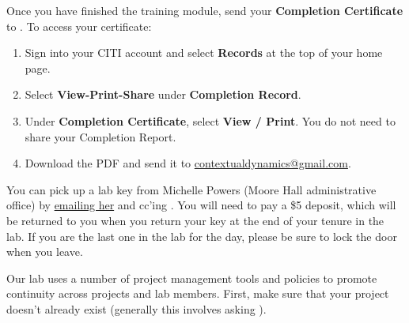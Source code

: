 \documentclass{tufte-book} %
\begin{document}
\noindent Once you have finished the training module, send your
\textbf{Completion Certificate} to \coordinator.  To access your
certificate:
\begin{enumerate}
\item Sign into your CITI account and select \textbf{Records} at the
  top of your home page.
\item Select \textbf{View-Print-Share} under \textbf{Completion
    Record}.
\item Under \textbf{Completion Certificate}, select \textbf{View /
    Print}.  You do not need to share your Completion Report.
\item Download the PDF and send it to
  \href{mailto:contextualdynamics@gmail.com}
  {contextualdynamics@gmail.com}.
\end{enumerate}


\noindent You can pick up a lab key from Michelle Powers (Moore Hall
administrative office) by
\href{mailto:Michelle.A.Powers@dartmouth.edu}{emailing her} and cc'ing
\director.  You will need to pay a \$5 deposit, which will be returned
to you when you return your key at the end of your tenure in the lab.
If you are the last one in the lab for the day, please be sure to lock
the door when you leave.


\noindent
Our lab uses a number of project management tools and policies to
promote continuity across projects and lab members.  First, make sure
that your project doesn't already exist (generally this involves
asking \director).
\end{document}
